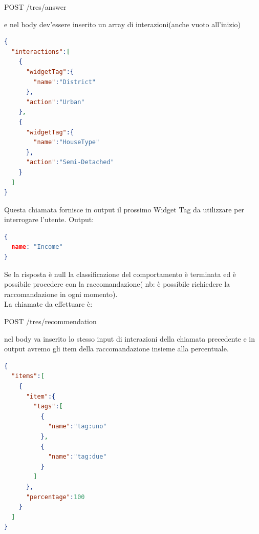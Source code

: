 \begin{center}
POST    /tres/answer
\end{center}

e nel body dev'essere inserito un array di interazioni(anche vuoto all'inizio)
\begin{lstlisting}[language=json,firstnumber=1]
{
  "interactions":[
    {
      "widgetTag":{
        "name":"District"
      },
      "action":"Urban"
    },
    {
      "widgetTag":{
        "name":"HouseType"
      },
      "action":"Semi-Detached"
    }  
  ]
}
\end{lstlisting}
Questa chiamata fornisce in output il prossimo Widget Tag da utilizzare per interrogare l'utente.
Output:
\begin{lstlisting}[language=json,firstnumber=1]
{
  name: "Income"
}
\end{lstlisting}
Se la risposta è null la classificazione del comportamento è terminata ed è possibile procedere con la raccomandazione( nb: è possibile richiedere la raccomandazione in ogni momento).\\
La chiamate da effettuare è:

\begin{center}
POST    /tres/recommendation
\end{center}

nel body va inserito lo stesso input di interazioni della chiamata precedente e in output avremo gli item della raccomandazione insieme alla percentuale.

\begin{lstlisting}[language=json,firstnumber=1]
{
  "items":[
    {
      "item":{
        "tags":[
          {
            "name":"tag:uno"
          },
          {
            "name":"tag:due"
          }
        ]
      },
      "percentage":100
    }
  ]
}
\end{lstlisting}

